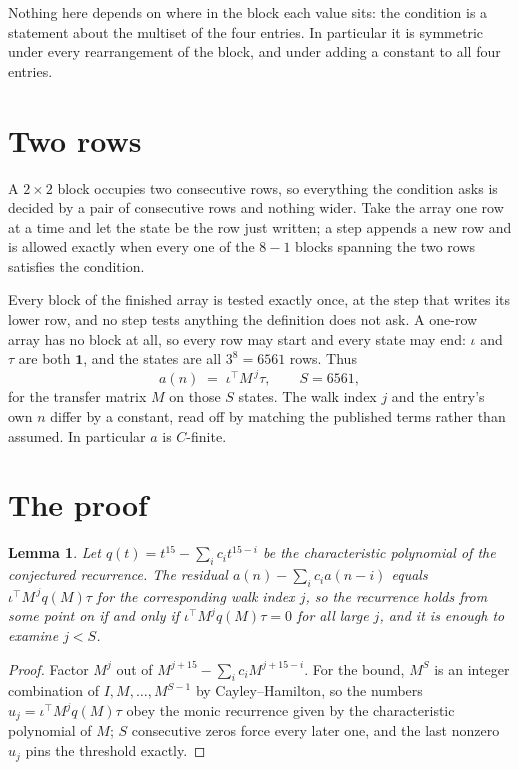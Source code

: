 \documentclass[11pt,a4paper]{article}
\theoremstyle{plain}
\newtheorem{lemma}[theorem]{Lemma}
\theoremstyle{definition}
\begin{document}
Nothing here depends on where in the block each value sits: the condition is a statement about
the multiset of the four entries. In particular it is symmetric under every rearrangement of
the block, and under adding a constant to all four entries.

\section{Two rows}

A $2\times2$ block occupies two consecutive rows, so everything the condition asks is decided
by a pair of consecutive rows and nothing wider. Take the array one row at a time and let the
state be the row just written; a step appends a new row and is allowed exactly when every one
of the $8-1$ blocks spanning the two rows satisfies the condition.

Every block of the finished array is tested exactly once, at the step that writes its lower
row, and no step tests anything the definition does not ask. A one-row array has no block at
all, so every row may start and every state may end: $\iota$ and $\tau$ are both
$\mathbf{1}$, and the states are all $3^{8}=6561$ rows. Thus
\[
a(n)\;=\;\iota^{\!\top}M^{\,j}\tau ,\qquad S=6561,
\]
for the transfer matrix $M$ on those $S$ states. The walk index $j$ and the entry's own $n$
differ by a constant, read off by matching the published terms rather than assumed. In
particular $a$ is $C$-finite.

\section{The proof}

\begin{lemma}\label{lem:crit}
Let $q(t)=t^{15}-\sum_i c_it^{15-i}$ be the characteristic polynomial of the
conjectured recurrence. The residual $a(n)-\sum_ic_ia(n-i)$ equals
$\iota^{\!\top}M^{\,j}q(M)\tau$ for the corresponding walk index $j$, so the recurrence
holds from some point on if and only if $\iota^{\!\top}M^{j}q(M)\tau=0$ for all large $j$,
and it is enough to examine $j<S$.
\end{lemma}

\begin{proof}
Factor $M^{j}$ out of $M^{j+15}-\sum_ic_iM^{j+15-i}$. For the bound, $M^{S}$
is an integer combination of $I,M,\dots,M^{S-1}$ by Cayley--Hamilton, so the numbers
$u_j=\iota^{\!\top}M^{j}q(M)\tau$ obey the monic recurrence given by the characteristic
polynomial of $M$; $S$ consecutive zeros force every later one, and the last nonzero $u_j$
pins the threshold exactly.
\end{proof}
\end{document}
